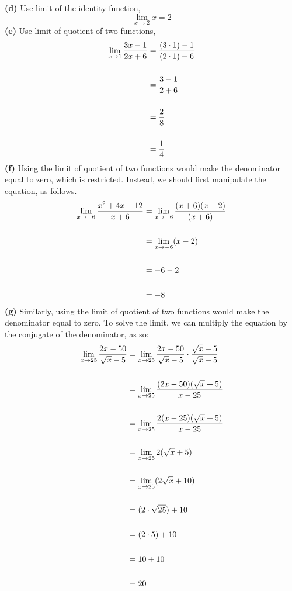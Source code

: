 \documentclass[hidelinks, a4paper, 12pt]{article}
\newcommand{\bd}{\textbf}
\newcommand{\n}{\\[\baselineskip]}
\begin{document}
                \bd{(d)} Use limit of the identity function,
                \[\lim_{x\to2} x = 2\]
                \bd{(e)} Use limit of quotient of two functions,
                \[\begin{split}
                    \lim_{x\to1} \frac{3x-1}{2x+6} &= \frac{(3\cdot1) - 1}{(2\cdot 1) + 6}\n
                    &= \frac{3-1}{2+6}\n
                    &= \frac{2}{8}\n
                    &= \frac{1}{4} 
                \end{split}\]
                \bd{(f)} Using the limit of quotient of two functions would make the denominator equal to zero, which is restricted. Instead, 
                we should first manipulate the equation, as follows.
                \[\begin{split}
                    \lim_{x\to -6} \frac{x^2+4x-12}{x+6} &= \lim_{x\to -6} \frac{(x+6)(x-2)}{(x+6)}\n
                    &= \lim_{x\to -6} (x-2)\n
                    &= -6 - 2\n
                    &= -8 
                \end{split}\]
                \bd{(g)} Similarly, using the limit of quotient of two functions would make the denominator equal to zero. To solve the limit, we
                can multiply the equation by the conjugate of the denominator, as so:
                \[\begin{split}
                    \lim_{x\to 25} \frac{2x-50}{\sqrt{x}-5} &= \lim_{x\to 25} \frac{2x-50}{\sqrt{x}-5} \cdot \frac{\sqrt{x}+5}{\sqrt{x}+5}\n
                    &= \lim_{x\to 25} \frac{(2x-50)(\sqrt{x}+5)}{x-25}\n
                    &= \lim_{x\to 25} \frac{2(x-25)(\sqrt{x}+5)}{x-25}\n
                    &= \lim_{x\to 25} 2(\sqrt{x}+5)\n
                    &= \lim_{x\to 25} (2\sqrt{x}+10)\n
                    &= (2\cdot \sqrt{25}) + 10\n
                    &= (2 \cdot 5) + 10\n
                    &= 10 + 10\n
                    &= 20
                \end{split}\]
    
\end{document}
